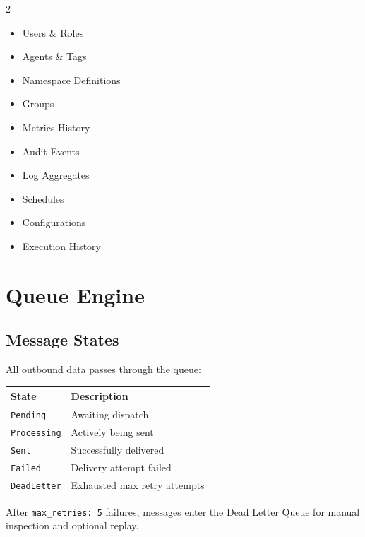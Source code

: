\documentclass[12pt,a4paper]{article}
\begin{document}
\begin{multicols}{2}
\begin{itemize}[noitemsep,leftmargin=*]
    \item Users \& Roles
    \item Agents \& Tags
    \item Namespace Definitions
    \item Groups
    \item Metrics History
    \item Audit Events
    \item Log Aggregates
    \item Schedules
    \item Configurations
    \item Execution History
\end{itemize}
\end{multicols}

\section{Queue Engine}

\subsection{Message States}

All outbound data passes through the queue:

\begin{center}
\begin{tabular}{ll}
\toprule
State & Description \\
\midrule
\texttt{Pending}    & Awaiting dispatch \\
\texttt{Processing} & Actively being sent \\
\texttt{Sent}       & Successfully delivered \\
\texttt{Failed}     & Delivery attempt failed \\
\texttt{DeadLetter} & Exhausted max retry attempts \\
\bottomrule
\end{tabular}
\end{center}

After \texttt{max\_retries: 5} failures, messages enter the Dead Letter Queue for manual inspection and optional replay.
\end{document}
